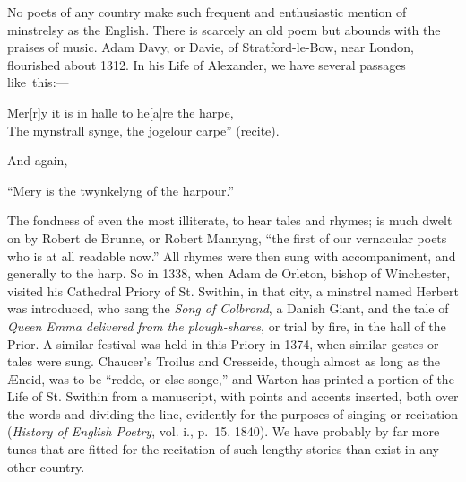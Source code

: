 No poets of any country make such frequent and enthusiastic mention of minstrelsy
as the English. There is scarcely an old poem but abounds with the
praises of music. Adam Davy, or Davie, of Stratford-le-Bow, near London,
flourished about 1312. In his Life of Alexander, we have several passages like~this:—
\settowidth{\versewidth}{The mynstrall synge, the jogelour carpe” (recite).}
\begin{scverse}
Mer[r]y it is in halle to he[a]re the harpe,\\
The mynstrall synge, the jogelour carpe” (recite).
\end{scverse}
And again,—
\settowidth{\versewidth}{“Mery is the twynkelyng of the harpour.”}
\begin{scverse}
“Mery is the twynkelyng of the harpour.”
\end{scverse}
The fondness of even the most illiterate, to hear tales and rhymes; is much
dwelt on by Robert de Brunne, or Robert Mannyng, “the first of our vernacular
poets who is at all readable now.” All rhymes were then sung with accompaniment, 
and generally to the harp. So in 1338, when Adam de Orleton, bishop of
Winchester, visited his Cathedral Priory of St. Swithin, in that city, a minstrel
named Herbert was introduced, who sang the \textit{Song of Colbrond}, a Danish Giant,
and the tale of \textit{Queen Emma delivered from the plough-shares}, or trial by fire, in
the hall of the Prior. A similar festival was held in this Priory in 1374, when
similar gestes or tales were sung. Chaucer’s Troilus and Cresseide, though almost
as long as the Æneid, was to be “redde, or else songe,” and Warton has printed
a portion of the Life of St. Swithin from a manuscript, with points and accents
inserted, both over the words and dividing the line, evidently for the purposes of
singing or recitation (\textit{History of English Poetry}, vol. i., p.~15. 1840). We have
probably by far more tunes that are fitted for the recitation of such lengthy stories
than exist in any other country.

